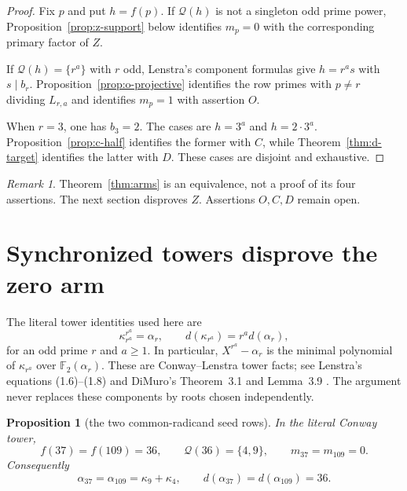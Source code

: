 \documentclass[11pt]{article}
\newtheorem{proposition}[theorem]{Proposition}
\theoremstyle{definition}
\theoremstyle{remark}
\newtheorem{remark}[theorem]{Remark}
\begin{document}
\begin{proof}
Fix $p$ and put $h=f(p)$.  If $\mathcal Q(h)$ is not a singleton odd prime
power, Proposition~\ref{prop:z-support} below identifies $m_p=0$ with the
corresponding primary factor of $Z$.

If $\mathcal Q(h)=\{r^a\}$ with $r$ odd, Lenstra's component formulas give
$h=r^as$ with $s\mid b_r$.  Proposition~\ref{prop:o-projective} identifies
the row primes with $p\ne r$ dividing $L_{r,a}$ and identifies $m_p=1$
with assertion $O$.

When $r=3$, one has $b_3=2$.  The cases are $h=3^a$ and
$h=2\cdot3^a$.  Proposition~\ref{prop:c-half} identifies the former with
$C$, while Theorem~\ref{thm:d-target} identifies the latter with $D$.
These cases are disjoint and exhaustive.
\end{proof}

\begin{remark}
Theorem~\ref{thm:arms} is an equivalence, not a proof of its four assertions.
The next section disproves $Z$.  Assertions $O,C,D$ remain open.
\end{remark}

\section{Synchronized towers disprove the zero arm}\label{sec:counterexample}

The literal tower identities used here are
\[
 \kappa_{r^a}^{r^a}=\alpha_r,\qquad
 d(\kappa_{r^a})=r^a d(\alpha_r),
\]
for an odd prime $r$ and $a\geq1$.  In particular,
$X^{r^a}-\alpha_r$ is the minimal polynomial of $\kappa_{r^a}$ over
$\mathbb F_2(\alpha_r)$.  These are Conway--Lenstra tower facts; see
Lenstra's equations (1.6)--(1.8) \cite{lenstra1977} and
DiMuro's Theorem~3.1 and Lemma~3.9 \cite{dimuro2011}.  The argument never
replaces these components by roots chosen independently.

\begin{proposition}[the two common-radicand seed rows]
\label{prop:z-shared-seeds}
In the literal Conway tower,
\[
 f(37)=f(109)=36,\qquad
 \mathcal Q(36)=\{4,9\},\qquad
 m_{37}=m_{109}=0.
\]
Consequently
\[
 \alpha_{37}=\alpha_{109}=\kappa_9+\kappa_4,
 \qquad d(\alpha_{37})=d(\alpha_{109})=36.
\]
\end{proposition}
\end{document}
